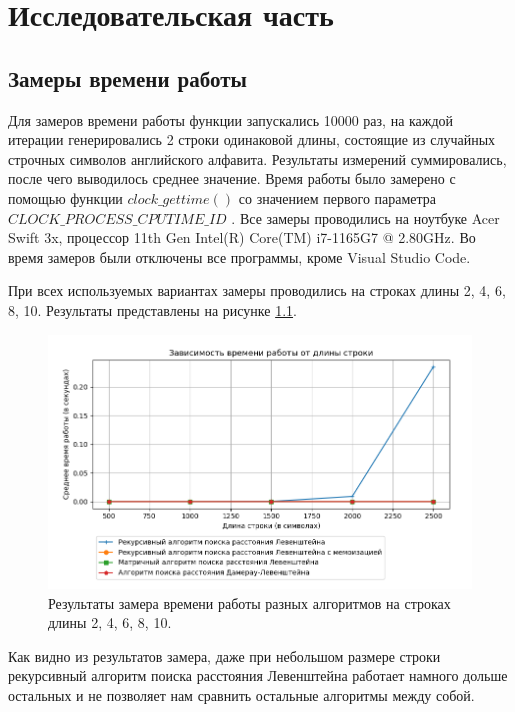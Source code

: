 \chapter{Исследовательская часть}

\section{Замеры времени работы}

Для замеров времени работы функции запускались 10000 раз, на каждой итерации генерировались 2 строки одинаковой длины, состоящие из случайных строчных символов английского алфавита. Результаты измерений суммировались, после чего выводилось среднее значение. Время работы было замерено с помощью функции $clock\_gettime()$ со значением первого параметра $CLOCK\_PROCESS\_CPUTIME\_ID$ \cite{clockgettime}. Все замеры проводились на ноутбуке Acer Swift 3x, процессор 11th Gen Intel(R) Core(TM) i7-1165G7 @ 2.80GHz. Во время замеров были отключены все программы, кроме Visual Studio Code.

При всех используемых вариантах замеры проводились на строках длины 2, 4, 6, 8, 10. Результаты представлены на рисунке \ref{fig:res1}.

\begin{figure}[h!]
	\centering
	\includegraphics[width=1\textwidth]{tex_parts/research1.png}
	\caption{\label{fig:res1} Результаты замера времени работы разных алгоритмов на строках длины 2, 4, 6, 8, 10.}
\end{figure}

Как видно из результатов замера, даже при небольшом размере строки рекурсивный алгоритм поиска расстояния Левенштейна работает намного дольше остальных и не позволяет нам сравнить остальные алгоритмы между собой.

